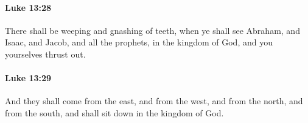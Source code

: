 		\paragraph{Luke 13:28} %
			\label{LUKE-13-28}

			There shall be weeping and gnashing of teeth, when ye shall see Abraham, and Isaac, and Jacob, and all the prophets, in the kingdom of God, and you yourselves thrust out.

			\begin{framed}
			\scriptsize
				\begin{compactdesc}
					\item[SBLG] 
				\end{compactdesc}
			\end{framed}

		\paragraph{Luke 13:29} %
			\label{LUKE-13-29}

			And they shall come from the east, and from the west, and from the north, and from the south, and shall sit down in the kingdom of God.

